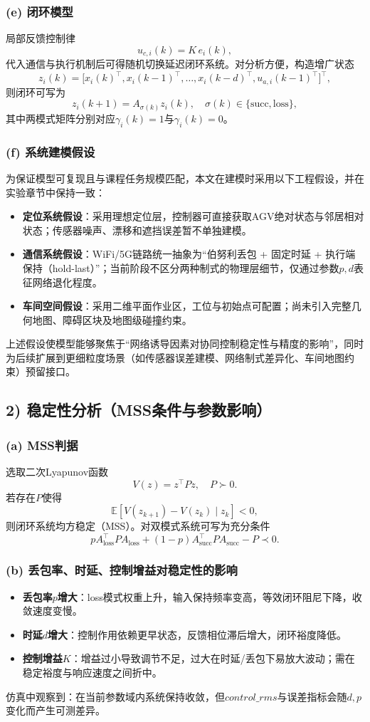 \documentclass[12pt,a4paper]{article}
\begin{document}
\subsubsection*{(e) 闭环模型}
局部反馈控制律
\[
u_{c,i}(k)=K\,e_i(k),
\]
代入通信与执行机制后可得随机切换延迟闭环系统。对分析方便，构造增广状态
\[
z_i(k)=\big[x_i(k)^\top,x_i(k-1)^\top,\dots,x_i(k-d)^\top,u_{a,i}(k-1)^\top\big]^\top,
\]
则闭环可写为
\[
z_i(k+1)=A_{\sigma(k)}z_i(k),\quad \sigma(k)\in\{\text{succ},\text{loss}\},
\]
其中两模式矩阵分别对应$\gamma_i(k)=1$与$\gamma_i(k)=0$。

\subsubsection*{(f) 系统建模假设}
为保证模型可复现且与课程任务规模匹配，本文在建模时采用以下工程假设，并在实验章节中保持一致：
\begin{itemize}
    \item \textbf{定位系统假设}：采用理想定位层，控制器可直接获取AGV绝对状态与邻居相对状态；传感器噪声、漂移和遮挡误差暂不单独建模。
    \item \textbf{通信系统假设}：WiFi/5G链路统一抽象为“伯努利丢包 + 固定时延 + 执行端保持（hold-last）”；当前阶段不区分两种制式的物理层细节，仅通过参数$p,d$表征网络退化程度。
    \item \textbf{车间空间假设}：采用二维平面作业区，工位与初始点可配置；尚未引入完整几何地图、障碍区块及地图级碰撞约束。
\end{itemize}
上述假设使模型能够聚焦于“网络诱导因素对协同控制稳定性与精度的影响”，同时为后续扩展到更细粒度场景（如传感器误差建模、网络制式差异化、车间地图约束）预留接口。

\subsection{2) 稳定性分析（MSS条件与参数影响）}
\subsubsection*{(a) MSS判据}
选取二次Lyapunov函数
\[
V(z)=z^\top P z,\quad P\succ0.
\]
若存在$P$使得
\[
\mathbb{E}\!\left[V(z_{k+1})-V(z_k)\mid z_k\right] <0,
\]
则闭环系统均方稳定（MSS）。对双模式系统可写为充分条件
\[
pA_{\text{loss}}^\top P A_{\text{loss}} + (1-p)A_{\text{succ}}^\top P A_{\text{succ}} - P \prec 0.
\]

\subsubsection*{(b) 丢包率、时延、控制增益对稳定性的影响}
\begin{itemize}
    \item \textbf{丢包率$p$增大}：loss模式权重上升，输入保持频率变高，等效闭环阻尼下降，收敛速度变慢。
    \item \textbf{时延$d$增大}：控制作用依赖更早状态，反馈相位滞后增大，闭环裕度降低。
    \item \textbf{控制增益$K$}：增益过小导致调节不足，过大在时延/丢包下易放大波动；需在稳定裕度与响应速度之间折中。
\end{itemize}
仿真中观察到：在当前参数域内系统保持收敛，但$control\_rms$与误差指标会随$d,p$变化而产生可测差异。
\end{document}
